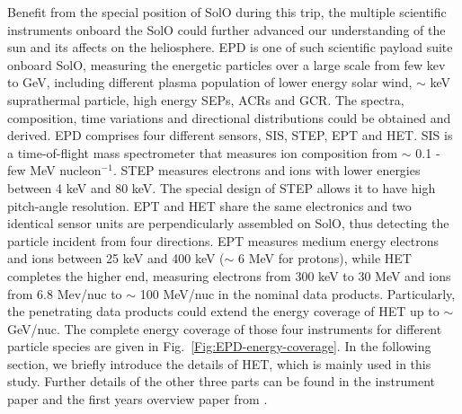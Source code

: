 Benefit from the special position of \ac{SolO} during this trip, the multiple scientific instruments onboard the \ac{SolO} could further advanced our understanding of the sun and its affects on the heliosphere.
\ac{EPD} \citet{RodriguezPacheco-2019-EPD} is one of such scientific payload suite onboard \ac{SolO}, measuring the energetic particles over a large scale from few kev to GeV, including different plasma population of lower energy solar wind,  $\sim$ keV suprathermal particle, high energy \acp{SEP}, \acp{ACR} and \ac{GCR}. The spectra, composition, time variations and directional distributions could be obtained and derived.
\ac{EPD} comprises four different sensors, \ac{SIS}, \ac{STEP}, \ac{EPT} and \ac{HET}. 
\ac{SIS} is a time-of-flight mass spectrometer that measures ion composition from $\sim$ 0.1 - few MeV nucleon$^{-1}$. \ac{STEP} measures electrons and ions with lower energies between 4 keV and 80 keV. The special design of \ac{STEP} allows it to have high pitch-angle resolution.
\ac{EPT} and \ac{HET} share the same electronics and two identical sensor units are perpendicularly assembled on \ac{SolO}, thus detecting the particle incident from four directions. \ac{EPT} measures medium energy electrons and ions between 25 keV and 400 keV ($\sim$ 6 MeV for protons), while \ac{HET} completes the higher end, measuring electrons from 300 keV to 30 MeV and ions from 6.8 Mev/nuc to $\sim$ 100 MeV/nuc in the nominal data products. Particularly, the penetrating data products could extend the energy coverage of \ac{HET} up to $\sim$ GeV/nuc. \citet{Elftmann-2020-PhD}
The complete energy coverage of those four instruments for different particle species are given in Fig.~\ref{Fig:EPD-energy-coverage}.
In the following section, we briefly introduce the details of \ac{HET}, which is mainly used in this study. Further details of the other three parts can be found in the instrument paper \citet{RodriguezPacheco-2019-EPD} and the first years overview paper from \citep{Wimmer2021AA}.


